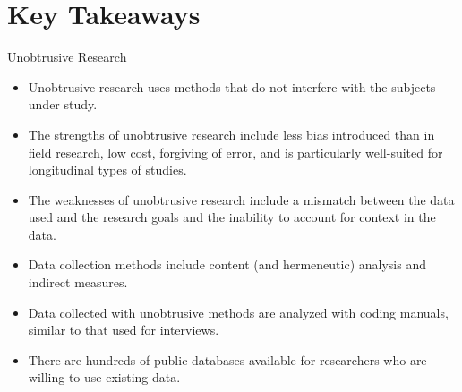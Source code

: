 \section{Key Takeaways}\label{ch12:summary}

\begin{center}
	\begin{tkawybox}{Unobtrusive Research}
		\begin{itemize}
			\setlength{\itemsep}{0pt}
			\setlength{\parskip}{0pt}
			\setlength{\parsep}{0pt}
			
			\item Unobtrusive research uses methods that do not interfere with the subjects under study.
			\item The strengths of unobtrusive research include less bias introduced than in field research, low cost, forgiving of error, and is particularly well-suited for longitudinal types of studies.
			\item The weaknesses of unobtrusive research include a mismatch between the data used and the research goals and the inability to account for context in the data.
			\item Data collection methods include content (and hermeneutic) analysis and indirect measures.
			\item Data collected with unobtrusive methods are analyzed with coding manuals, similar to that used for interviews.
			\item There are hundreds of public databases available for researchers who are willing to use existing data. 
		\end{itemize}
	\end{tkawybox}
\end{center}

